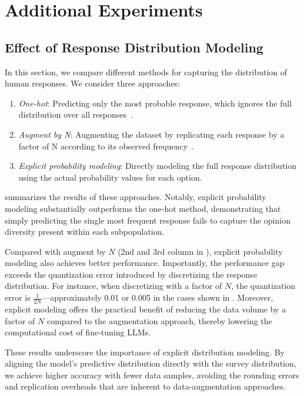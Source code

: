 \section{Additional Experiments}
\subsection{Effect of Response Distribution Modeling}
\label{section_experiments_modeling_response_distribution}

In this section, we compare different methods for capturing the distribution of human responses. We consider three approaches:
\begin{enumerate}
    \item \emph{One-hot}: Predicting only the most probable response, which ignores the full distribution over all responses~\cite{li2024culturellm}.
    \item \emph{Augment by N}: Augmenting the dataset by replicating each response by a factor of N according to its observed frequency~\cite{zhao2023group}.
    \item \emph{Explicit probability modeling}: Directly modeling the full response distribution using the actual probability values for each option.
\end{enumerate}

 summarizes the results of these approaches. Notably, explicit probability modeling substantially outperforms the one-hot method, demonstrating that simply predicting the single most frequent response fails to capture the opinion diversity present within each subpopulation.

Compared with augment by \(N\) (2nd and 3rd column in ), explicit probability modeling also achieves better performance. 
Importantly, the performance gap exceeds the quantization error introduced by discretizing the response distribution. 
For instance, when discretizing with a factor of \(N\), the quantization error is \(\frac{1}{2N}\)—approximately 0.01 or 0.005 in the cases shown in . 
Moreover, explicit modeling offers the practical benefit of reducing the data volume by a factor of \(N\) compared to the augmentation approach, thereby lowering the computational cost of fine-tuning LLMs.

These results underscore the importance of explicit distribution modeling. 
By aligning the model’s predictive distribution directly with the survey distribution, we achieve higher accuracy with fewer data samples, avoiding the rounding errors and replication overheads that are inherent to data-augmentation approaches.

